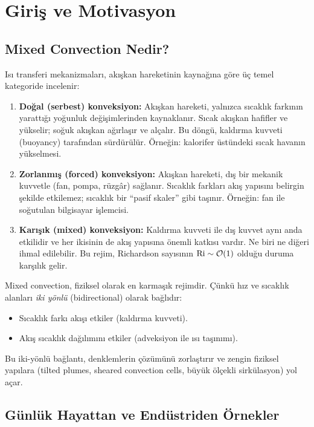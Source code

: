 \chapter{Giriş ve Motivasyon}
\label{ch:giris}

\section{Mixed Convection Nedir?}
\label{sec:mixed_nedir}

Isı transferi mekanizmaları, akışkan hareketinin kaynağına göre üç temel kategoride incelenir:

\begin{enumerate}
    \item \textbf{Doğal (serbest) konveksiyon:} Akışkan hareketi, yalnızca sıcaklık farkının yarattığı yoğunluk değişimlerinden kaynaklanır. Sıcak akışkan hafifler ve yükselir; soğuk akışkan ağırlaşır ve alçalır. Bu döngü, kaldırma kuvveti (buoyancy) tarafından sürdürülür. Örneğin: kalorifer üstündeki sıcak havanın yükselmesi.

    \item \textbf{Zorlanmış (forced) konveksiyon:} Akışkan hareketi, dış bir mekanik kuvvetle (fan, pompa, rüzgâr) sağlanır. Sıcaklık farkları akış yapısını belirgin şekilde etkilemez; sıcaklık bir ``pasif skaler'' gibi taşınır. Örneğin: fan ile soğutulan bilgisayar işlemcisi.

    \item \textbf{Karışık (mixed) konveksiyon:} Kaldırma kuvveti ile dış kuvvet aynı anda etkilidir ve her ikisinin de akış yapısına önemli katkısı vardır. Ne biri ne diğeri ihmal edilebilir. Bu rejim, Richardson sayısının $\mathrm{Ri} \sim \mathcal{O}(1)$ olduğu duruma karşılık gelir.
\end{enumerate}

Mixed convection, fiziksel olarak en karmaşık rejimdir. Çünkü hız ve sıcaklık alanları \textit{iki yönlü} (bidirectional) olarak bağlıdır:
\begin{itemize}
    \item Sıcaklık farkı akışı etkiler (kaldırma kuvveti).
    \item Akış sıcaklık dağılımını etkiler (adveksiyon ile ısı taşınımı).
\end{itemize}
Bu iki-yönlü bağlantı, denklemlerin çözümünü zorlaştırır ve zengin fiziksel yapılara (tilted plumes, sheared convection cells, büyük ölçekli sirkülasyon) yol açar.


\section{Günlük Hayattan ve Endüstriden Örnekler}
\label{sec:ornekler}

